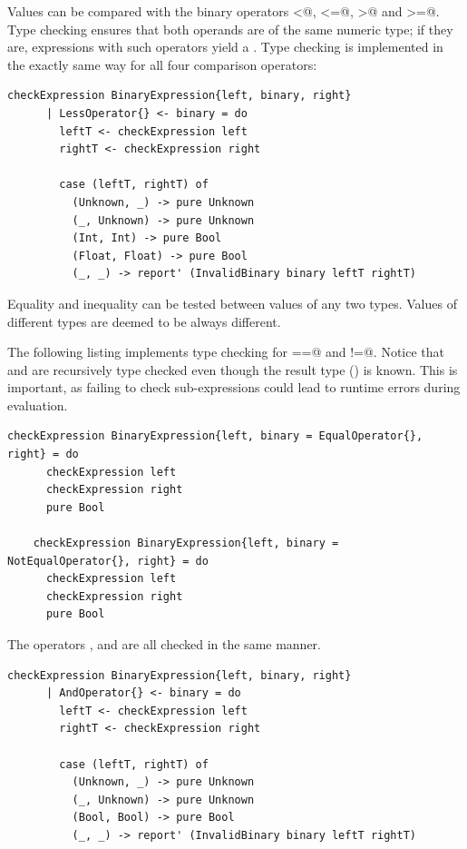 \documentclass[UdineBachThesis,american,11pt]{PhdThesis}
\begin{document}
  Values can be compared with the binary operators \lstinline@<@,
  \lstinline@<=@, \lstinline@>@ and \lstinline@>=@. Type checking ensures that
  both operands are of the same numeric type; if they are, expressions with such
  operators yield a \lstinline@Bool@. Type checking is implemented in the
  exactly same way for all four comparison operators:

  \begin{lstlisting}[gobble=4,basicstyle=\ttfamily\small]
    checkExpression BinaryExpression{left, binary, right}
      | LessOperator{} <- binary = do
        leftT <- checkExpression left
        rightT <- checkExpression right

        case (leftT, rightT) of
          (Unknown, _) -> pure Unknown
          (_, Unknown) -> pure Unknown
          (Int, Int) -> pure Bool
          (Float, Float) -> pure Bool
          (_, _) -> report' (InvalidBinary binary leftT rightT)
  \end{lstlisting}

  Equality and inequality can be tested between values of any two types. Values
  of different types are deemed to be always different.

  The following listing implements type checking for \lstinline@==@ and
  \lstinline@!=@. Notice that \lstinline@left@ and \lstinline@right@ are
  recursively type checked even though the result type (\lstinline@Bool@) is
  known. This is important, as failing to check sub-expressions could lead to
  runtime errors during evaluation.

  \begin{lstlisting}[gobble=4,basicstyle=\ttfamily\small]
    checkExpression BinaryExpression{left, binary = EqualOperator{}, right} = do
      checkExpression left
      checkExpression right
      pure Bool

    checkExpression BinaryExpression{left, binary = NotEqualOperator{}, right} = do
      checkExpression left
      checkExpression right
      pure Bool
  \end{lstlisting}

  The operators \lstinline@and@, \lstinline@or@ and \lstinline@xor@ are all
  checked in the same manner.

  \newpage

  \begin{lstlisting}[gobble=4,basicstyle=\ttfamily\small]
    checkExpression BinaryExpression{left, binary, right}
      | AndOperator{} <- binary = do
        leftT <- checkExpression left
        rightT <- checkExpression right

        case (leftT, rightT) of
          (Unknown, _) -> pure Unknown
          (_, Unknown) -> pure Unknown
          (Bool, Bool) -> pure Bool
          (_, _) -> report' (InvalidBinary binary leftT rightT)
  \end{lstlisting}
\end{document}
